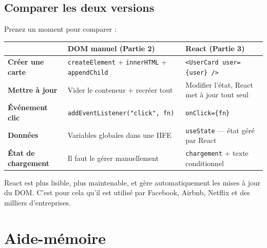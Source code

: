 \documentclass[11pt,a4paper]{article}
\begin{document}
\subsection{Comparer les deux versions}

Prenez un moment pour comparer :

\begin{center}
\begin{tabular}{lp{5cm}p{5cm}}
\toprule
& \textbf{DOM manuel} (Partie 2) & \textbf{React} (Partie 3) \\
\midrule
\textbf{Créer une carte} & \texttt{createElement} + \texttt{innerHTML} + \texttt{appendChild} & \texttt{<UserCard user=\{user\} />} \\
\textbf{Mettre à jour} & Vider le conteneur + recréer tout & Modifier l'état, React met à jour tout seul \\
\textbf{Événement clic} & \texttt{addEventListener("click", fn)} & \texttt{onClick=\{fn\}} \\
\textbf{Données} & Variables globales dans une IIFE & \texttt{useState} --- état géré par React \\
\textbf{État de chargement} & Il faut le gérer manuellement & \texttt{chargement} + texte conditionnel \\
\bottomrule
\end{tabular}
\end{center}

React est plus lisible, plus maintenable, et gère automatiquement les mises à jour du DOM. C'est pour cela qu'il est utilisé par Facebook, Airbnb, Netflix et des milliers d'entreprises.

\section{Aide-mémoire}
\label{sec:aide-memoire}
\end{document}
